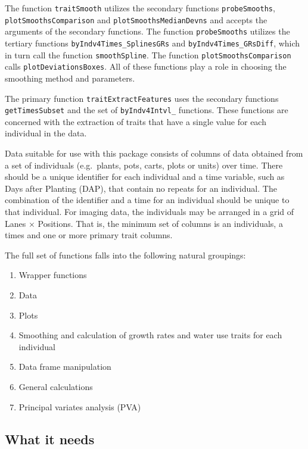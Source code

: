\documentclass[
]{article}
\begin{document}
The function \texttt{traitSmooth} utilizes the secondary functions
\texttt{probeSmooths}, \texttt{plotSmoothsComparison} and
\texttt{plotSmoothsMedianDevns} and accepts the arguments of the
secondary functions. The function \texttt{probeSmooths} utilizes the
tertiary functions \texttt{byIndv4Times\_SplinesGRs} and
\texttt{byIndv4Times\_GRsDiff}, which in turn call the function
\texttt{smoothSpline}. The function \texttt{plotSmoothsComparison} calls
\texttt{plotDeviationsBoxes}. All of these functions play a role in
choosing the smoothing method and parameters.

The primary function \texttt{traitExtractFeatures} uses the secondary
functions \texttt{getTimesSubset} and the set of \texttt{byIndv4Intvl\_}
functions. These functions are concerned with the extraction of traits
that have a single value for each individual in the data.

Data suitable for use with this package consists of columns of data
obtained from a set of individuals (e.g.~plants, pots, carts, plots or
units) over time. There should be a unique identifier for each
individual and a time variable, such as Days after Planting (DAP), that
contain no repeats for an individual. The combination of the identifier
and a time for an individual should be unique to that individual. For
imaging data, the individuals may be arranged in a grid of Lanes
\(\times\) Positions. That is, the minimum set of columns is an
individuals, a times and one or more primary trait columns.

The full set of functions falls into the following natural groupings:

\begin{enumerate}
\def\labelenumi{(\roman{enumi})}
\item
  Wrapper functions
\item
  Data
\item
  Plots
\item
  Smoothing and calculation of growth rates and water use traits for
  each individual
\item
  Data frame manipulation
\item
  General calculations
\item
  Principal variates analysis (PVA)
\end{enumerate}

\hypertarget{what-it-needs}{%
\subsection{What it needs}\label{what-it-needs}}
\end{document}
